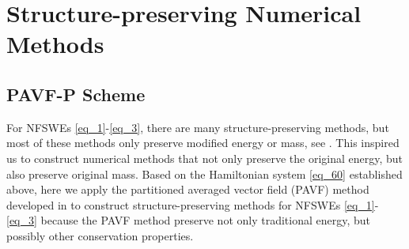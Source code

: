 \documentclass[preprint,compress,3p,10pt,fleqn]{elsarticle}
\numberwithin{equation}{section}
\begin{document}
\section{Structure-preserving Numerical Methods}\label{Section 3}
\subsection{PAVF-P Scheme}

For NFSWEs \eqref{eq_1}-\eqref{eq_3}, there are many structure-preserving methods, but most of these methods only preserve modified energy or mass, see \cite{liFastEnergyConserving2018,huEfficientEnergyPreserving2022}. This inspired us to construct numerical methods that not only preserve the original energy, but also preserve original mass. Based on the Hamiltonian system \eqref{eq_60} established above, here we apply the partitioned averaged vector field (PAVF) method developed in  \cite{caiPartitionedAveragedVector2018} to construct structure-preserving methods for NFSWEs \eqref{eq_1}-\eqref{eq_3} because the PAVF method preserve not only traditional energy, but possibly other conservation properties.
\end{document}
